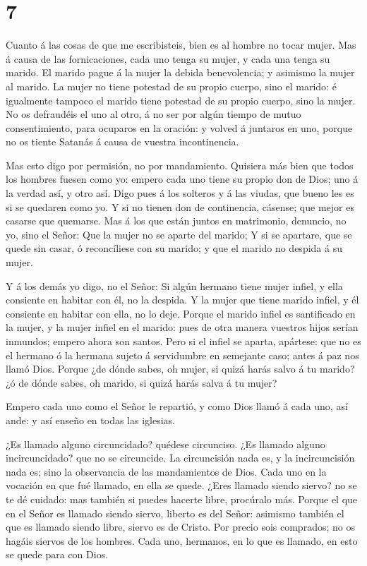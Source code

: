 \hypertarget{section-6}{%
\section{7}\label{section-6}}

 Cuanto á las cosas de que me escribisteis, bien es al
hombre no tocar mujer.  Mas á causa de las fornicaciones,
cada uno tenga su mujer, y cada una tenga su marido.  El
marido pague á la mujer la debida benevolencia; y asimismo la mujer al
marido.  La mujer no tiene potestad de su propio cuerpo,
sino el marido: é igualmente tampoco el marido tiene potestad de su
propio cuerpo, sino la mujer.  No os defraudéis el uno al
otro, á no ser por algún tiempo de mutuo consentimiento, para ocuparos
en la oración: y volved á juntaros en uno, porque no os tiente Satanás á
causa de vuestra incontinencia.

 Mas esto digo por permisión, no por mandamiento.
 Quisiera más bien que todos los hombres fuesen como yo:
empero cada uno tiene su propio don de Dios; uno á la verdad así, y otro
así.  Digo pues á los solteros y á las viudas, que bueno les
es si se quedaren como yo.  Y si no tienen don de
continencia, cásense; que mejor es casarse que quemarse. 
Mas á los que están juntos en matrimonio, denuncio, no yo, sino el
Señor: Que la mujer no se aparte del marido;  Y si se
apartare, que se quede sin casar, ó reconcíliese con su marido; y que el
marido no despida á su mujer.

 Y á los demás yo digo, no el Señor: Si algún hermano tiene
mujer infiel, y ella consiente en habitar con él, no la despida.
 Y la mujer que tiene marido infiel, y él consiente en
habitar con ella, no lo deje.  Porque el marido infiel es
santificado en la mujer, y la mujer infiel en el marido: pues de otra
manera vuestros hijos serían inmundos; empero ahora son santos.
 Pero si el infiel se aparta, apártese: que no es el
hermano ó la hermana sujeto á servidumbre en semejante caso; antes á paz
nos llamó Dios.  Porque ¿de dónde sabes, oh mujer, si quizá
harás salvo á tu marido? ¿ó de dónde sabes, oh marido, si quizá harás
salva á tu mujer?

 Empero cada uno como el Señor le repartió, y como Dios
llamó á cada uno, así ande: y así enseño en todas las iglesias.

 ¿Es llamado alguno circuncidado? quédese circunciso. ¿Es
llamado alguno incircuncidado? que no se circuncide.  La
circuncisión nada es, y la incircuncisión nada es; sino la observancia
de las mandamientos de Dios.  Cada uno en la vocación en
que fué llamado, en ella se quede.  ¿Eres llamado siendo
siervo? no se te dé cuidado: mas también si puedes hacerte libre,
procúralo más.  Porque el que en el Señor es llamado siendo
siervo, liberto es del Señor: asimismo también el que es llamado siendo
libre, siervo es de Cristo.  Por precio sois comprados; no
os hagáis siervos de los hombres.  Cada uno, hermanos, en
lo que es llamado, en esto se quede para con Dios.

